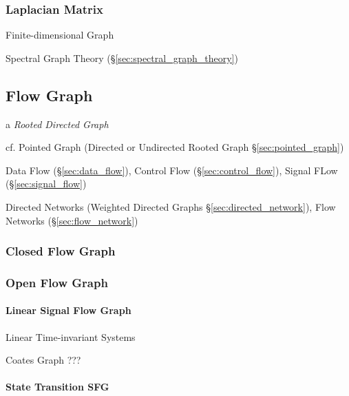 \subsubsection{Laplacian Matrix}\label{sec:laplacian_matrix}

Finite-dimensional Graph

\fist Spectral Graph Theory (\S\ref{sec:spectral_graph_theory})



\subsection{Flow Graph}\label{sec:flow_graph}

a \emph{Rooted Directed Graph}

cf. Pointed Graph (Directed or Undirected Rooted Graph
\S\ref{sec:pointed_graph})

\fist Data Flow (\S\ref{sec:data_flow}), Control Flow
(\S\ref{sec:control_flow}), Signal FLow (\S\ref{sec:signal_flow})

\fist Directed Networks (Weighted Directed Graphs \S\ref{sec:directed_network}),
Flow Networks (\S\ref{sec:flow_network})



\subsubsection{Closed Flow Graph}\label{sec:closed_flowgraph}

\subsubsection{Open Flow Graph}\label{sec:open_flowgraph}

\paragraph{Linear Signal Flow Graph}\label{sec:linear_signal_flow}\hfill

Linear Time-invariant Systems

Coates Graph ??? %



\paragraph{State Transition SFG}\label{sec:state_transition_sfg}\hfill

